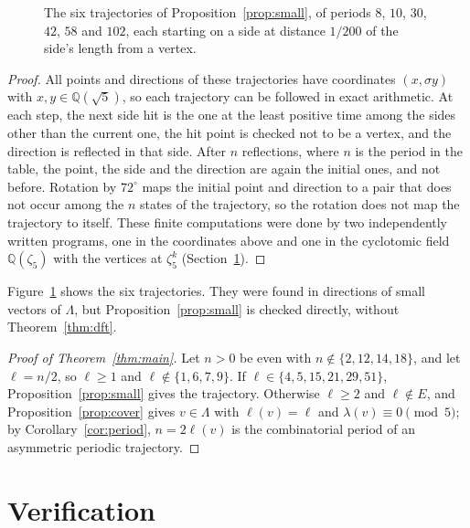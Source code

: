 \documentclass[11pt]{article}
\theoremstyle{definition}
\theoremstyle{remark}
\begin{document}
\begin{figure}[tb]
\caption{The six trajectories of Proposition~\ref{prop:small}, of periods
$8$, $10$, $30$, $42$, $58$ and $102$, each starting on a side at distance
$1/200$ of the side's length from a vertex.}
\label{fig:paths}
\end{figure}

\begin{proof}
All points and directions of these trajectories have coordinates $(x,\sigma y)$
with $x,y\in\mathbb{Q}(\sqrt5)$, so each trajectory can be followed in
exact arithmetic. At each step, the next side hit is the one at the least
positive time among the sides other than the current one, the hit point is
checked not to be a vertex, and the direction is reflected in that side.
After $n$ reflections, where $n$ is the period in the table, the point,
the side and the direction are again the initial ones, and not before.
Rotation by $72^\circ$ maps the initial point and direction to a pair that
does not occur among the $n$ states of the trajectory, so the rotation does
not map the trajectory to itself. These finite computations were done by
two independently written programs, one in the coordinates above and one
in the cyclotomic field $\mathbb{Q}(\zeta_5)$ with the vertices at
$\zeta_5^k$ (Section~\ref{sec:verification}).
\end{proof}

Figure~\ref{fig:paths} shows the six trajectories. They were found in
directions of small vectors of $\Lambda$,
but Proposition~\ref{prop:small} is checked directly, without
Theorem~\ref{thm:dft}.

\begin{proof}[Proof of Theorem~\ref{thm:main}]
Let $n>0$ be even with $n\notin\{2,12,14,18\}$, and let $\ell=n/2$, so
$\ell\ge1$ and $\ell\notin\{1,6,7,9\}$. If $\ell\in\{4,5,15,21,29,51\}$,
Proposition~\ref{prop:small} gives the trajectory. Otherwise $\ell\ge2$
and $\ell\notin E$, and Proposition~\ref{prop:cover} gives $v\in\Lambda$
with $\ell(v)=\ell$ and $\lambda(v)\equiv0\pmod5$; by
Corollary~\ref{cor:period}, $n=2\ell(v)$ is the combinatorial period of an
asymmetric periodic trajectory.
\end{proof}

\section{Verification}\label{sec:verification}
\end{document}
